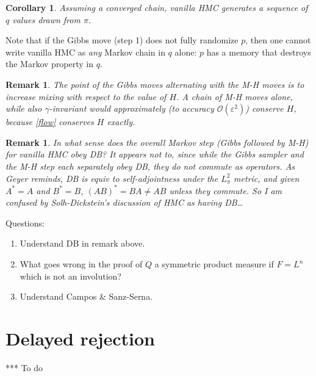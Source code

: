 \documentclass[10pt]{article}
\newcommand{\ben}{\begin{enumerate}}
\newcommand{\een}{\end{enumerate}}
\newcommand{\bigO}{{\mathcal O}}
\newtheorem{cor}[thm]{Corollary}
\newtheorem{rmk}[thm]{Remark}
\newcommand{\eps}{\varepsilon}
\begin{document}
\begin{cor}
  Assuming a converged chain,
  vanilla HMC generates a sequence of $q$ values drawn from $\pi$.
\end{cor}
Note that if the Gibbs move (step 1) does not fully randomize $p$,
then one cannot write vanilla HMC as {\em any} Markov chain in $q$ alone:
$p$ has a memory that destroys the Markov property in $q$.



\begin{rmk}
  The point of the Gibbs moves alternating with the M-H moves
  is to increase mixing with respect to
  the value of $H$. A chain of M-H moves alone, while
  also $\gamma$-invariant would approximately
  (to accuracy $\bigO(\eps^2)$) conserve $H$, because \eqref{flow} conserves
  $H$ exactly.
\end{rmk}

\begin{rmk}
  In what sense does the overall Markov step (Gibbs followed by M-H) for vanilla HMC obey DB?
  It appears not to, since while the Gibbs sampler and the M-H step
  each separately obey DB, they do not commute as operators.
  As Geyer reminds, DB is equiv to self-adjointness under the $L^2_\pi$ metric,
  and given $A^\ast=A$ and $B^\ast=B$,
  $(AB)^\ast = BA \neq AB$ unless they commute.
  So I am confused by Solh-Dickstein's discussion of HMC as having DB\ldots
\end{rmk}

Questions:
\ben
\item Understand DB in remark above.
\item What goes wrong in the proof of $Q$ a symmetric product measure
  if $F=L^n$ which is not an involution?
\item Understand Campos \& Sanz-Serna.
\een
  



\section{Delayed rejection}

*** To do







\end{document}
